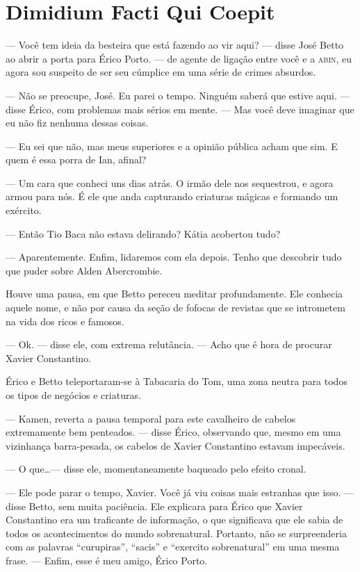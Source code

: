 \chapter{Dimidium Facti Qui Coepit}


--- Você tem ideia da besteira que está fazendo ao vir aqui? --- disse
José Betto ao abrir a porta para Érico Porto. --- de agente de ligação
entre você e a \textsc{abin}, eu agora sou suspeito de ser seu cúmplice
em uma série de crimes absurdos.

--- Não se preocupe, José. Eu parei o tempo. Ninguém saberá que estive
aqui. --- disse Érico, com problemas mais sérios em mente. --- Mas você
deve imaginar que eu não fiz nenhuma dessas coisas.

--- Eu sei que não, mas meus superiores e a opinião pública acham que
sim. E quem é essa porra de Ian, afinal?

--- Um cara que conheci uns dias atrás. O irmão dele nos sequestrou, e
agora armou para nós. É ele que anda capturando criaturas mágicas e
formando um exército.

--- Então Tio Baca não estava delirando? Kátia acobertou tudo?

--- Aparentemente. Enfim, lidaremos com ela depois. Tenho que descobrir
tudo que puder sobre Alden Abercrombie.

Houve uma pausa, em que Betto pereceu meditar profundamente. Ele
conhecia aquele nome, e não por causa da seção de fofocas de revistas
que se intrometem na vida dos ricos e famosos.

--- Ok. --- disse ele, com extrema relutância. --- Acho que é hora de
procurar Xavier Constantino.



Érico e Betto teleportaram-se à Tabacaria do Tom, uma zona neutra para
todos os tipos de negócios e criaturas.

--- Kamen, reverta a pausa temporal para este cavalheiro de cabelos
extremamente bem penteados. --- disse Érico, observando que, mesmo em
uma vizinhança barra-pesada, os cabelos de Xavier Constantino estavam
impecáveis.

--- O que\ldots --- disse ele, momentaneamente baqueado pelo efeito
cronal.

--- Ele pode parar o tempo, Xavier. Você já viu coisas mais estranhas
que isso. --- disse Betto, sem muita paciência. Ele explicara para Érico
que Xavier Constantino era um traficante de informação, o que
significava que ele sabia de todos os acontecimentos do mundo
sobrenatural. Portanto, não se surpreenderia com as palavras
“curupiras”, “sacis” e “exercito sobrenatural” em uma mesma frase. ---
Enfim, esse é meu amigo, Érico Porto.

